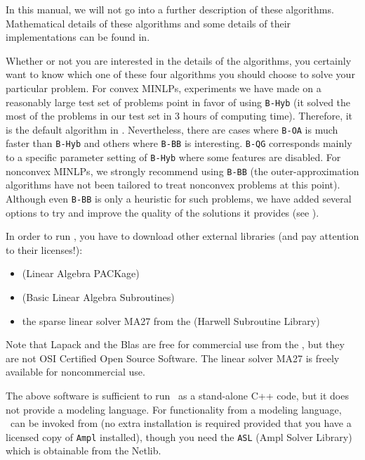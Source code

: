 In this manual,  we will not go into a further description of these algorithms.
Mathematical details of these algorithms 
and some details of their implementations can be found in.

Whether or not you are interested in the details of the algorithms, you certainly
want to know which one of these four algorithms you should choose to solve
your particular problem.
For convex MINLPs, experiments we have made on a reasonably large test set of problems point in favor of using {\tt B-Hyb}
(it solved the most of the problems in our test set in 3 hours of computing time).
Therefore, it is the default algorithm in \Bonmin.
Nevertheless, there are cases where {\tt B-OA} is much faster than {\tt B-Hyb} and others where {\tt B-BB} is interesting.
{\tt B-QG} corresponds mainly to a specific parameter setting of {\tt B-Hyb} where some features are disabled.
For nonconvex MINLPs, we strongly recommend using {\tt B-BB} (the outer-approximation algorithms
have not been tailored to treat nonconvex problems at this point). Although even {\tt B-BB} is only a
heuristic for such problems, we have added several
options to try and improve the quality of the solutions it provides (see ).

In order to run {\Bonmin}, you have to download other external
libraries (and pay attention to their licenses!):
\begin{itemize}
\item {} (Linear Algebra
PACKage)
\item {} (Basic Linear Algebra
Subroutines)
\item the sparse linear solver MA27 from the
(Harwell Subroutine Library)
\end{itemize}

Note that Lapack and the Blas are free for commercial use from the
, but they are
not OSI Certified Open Source Software. The linear solver MA27 is
freely available for noncommercial use.

The above software is sufficient to run \Bonmin\ as a
stand-alone C++ code, but it does not provide a modeling language.
For functionality from a modeling language, \Bonmin\ can be
invoked from  (no extra installation is required provided
that you have a licensed copy of {\tt Ampl} installed), though you
need the {\tt ASL} (Ampl Solver Library) which is obtainable from the Netlib.

